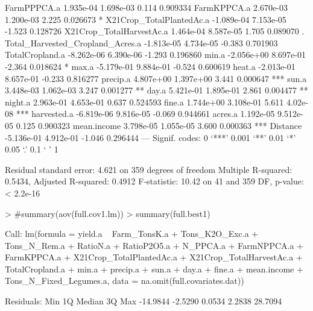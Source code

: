 \documentclass{report}
\begin{document}
\begin{Schunk}
\begin{Soutput}
FarmPPPCA.a                       1.935e-04  1.698e-03   0.114 0.909334    
FarmKPPCA.a                       2.670e-03  1.200e-03   2.225 0.026673 *  
X21Crop_TotalPlantedAc.a         -1.089e-04  7.153e-05  -1.523 0.128726    
X21Crop_TotalHarvestAc.a          1.464e-04  8.587e-05   1.705 0.089070 .  
Total_Harvested_Cropland_Acres.a -1.813e-05  4.734e-05  -0.383 0.701903    
TotalCropland.a                  -8.262e-06  6.390e-06  -1.293 0.196860    
min.a                            -2.056e+00  8.697e-01  -2.364 0.018624 *  
max.a                            -5.179e-01  9.884e-01  -0.524 0.600619    
heat.a                           -2.013e-01  8.657e-01  -0.233 0.816277    
precip.a                          4.807e+00  1.397e+00   3.441 0.000647 ***
sun.a                             3.448e-03  1.062e-03   3.247 0.001277 ** 
day.a                             5.421e-01  1.895e-01   2.861 0.004477 ** 
night.a                           2.963e-01  4.653e-01   0.637 0.524593    
fine.a                            1.744e+00  3.108e-01   5.611 4.02e-08 ***
harvested.a                      -6.819e-06  9.816e-05  -0.069 0.944661    
acres.a                           1.192e-05  9.512e-05   0.125 0.900323    
mean.income                       3.798e-05  1.055e-05   3.600 0.000363 ***
Distance                         -5.136e-01  4.912e-01  -1.046 0.296444    
---
Signif. codes:  0 ‘***’ 0.001 ‘**’ 0.01 ‘*’ 0.05 ‘.’ 0.1 ‘ ’ 1

Residual standard error: 4.621 on 359 degrees of freedom
Multiple R-squared:  0.5434,	Adjusted R-squared:  0.4912 
F-statistic: 10.42 on 41 and 359 DF,  p-value: < 2.2e-16
\end{Soutput}
\begin{Sinput}
> #summary(aov(full.cov1.lm))
> summary(full.best1)
\end{Sinput}
\begin{Soutput}
Call:
lm(formula = yield.a ~ Farm_TonsK.a + Tons_K2O_Exc.a + Tons_N_Rem.a + 
    RatioN.a + RatioP2O5.a + N_PPCA.a + FarmNPPCA.a + FarmKPPCA.a + 
    X21Crop_TotalPlantedAc.a + X21Crop_TotalHarvestAc.a + TotalCropland.a + 
    min.a + precip.a + sun.a + day.a + fine.a + mean.income + 
    Tons_N_Fixed_Legumes.a, data = na.omit(full.covariates.dat))

Residuals:
     Min       1Q   Median       3Q      Max 
-14.9844  -2.5290   0.0534   2.2838  28.7094 


\end{Soutput}
\end{Schunk}
\end{document}
